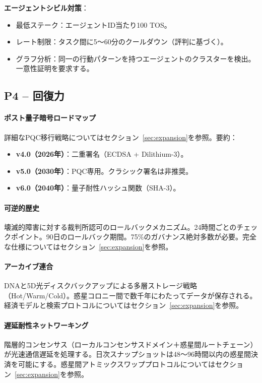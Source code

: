 \documentclass[11pt]{article}
\begin{document}
\textbf{エージェントシビル対策}：
\begin{itemize}[noitemsep]
  \item 最低ステーク：エージェントID当たり100 TOS。
  \item レート制限：タスク間に5〜60分のクールダウン（評判に基づく）。
  \item グラフ分析：同一の行動パターンを持つエージェントのクラスターを検出。一意性証明を要求する。
\end{itemize}

\subsection{P4 -- 回復力}
\label{sec:pillar-resilience}

\paragraph{ポスト量子暗号ロードマップ}
詳細なPQC移行戦略についてはセクション~\ref{sec:expansion}を参照。要約：
\begin{itemize}[noitemsep]
  \item \textbf{v4.0（2026年）}：二重署名（ECDSA + Dilithium-3）。
  \item \textbf{v5.0（2030年）}：PQC専用。クラシック署名は非推奨。
  \item \textbf{v6.0（2040年）}：量子耐性ハッシュ関数（SHA-3）。
\end{itemize}

\paragraph{可逆的歴史}
壊滅的障害に対する裁判所認可のロールバックメカニズム。24時間ごとのチェックポイント。90日のロールバック期間。75\%のガバナンス絶対多数が必要。完全な仕様についてはセクション~\ref{sec:expansion}を参照。

\paragraph{アーカイブ連合}
DNAと5D光ディスクバックアップによる多層ストレージ戦略（Hot/Warm/Cold）。惑星コロニー間で数千年にわたってデータが保存される。経済モデルと検索プロトコルについてはセクション~\ref{sec:expansion}を参照。

\paragraph{遅延耐性ネットワーキング}
階層的コンセンサス（ローカルコンセンサスドメイン＋惑星間ルートチェーン）が光速通信遅延を処理する。日次スナップショットは48〜96時間以内の惑星間決済を可能にする。惑星間アトミックスワッププロトコルについてはセクション~\ref{sec:expansion}を参照。
\end{document}
